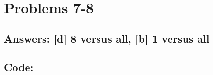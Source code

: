 \documentclass[11pt]{article}
\begin{document}
\hypertarget{problems-7-8}{%
\section{Problems 7-8}\label{problems-7-8}}

\hypertarget{answers-d-8-versus-all-b-1-versus-all}{%
\subsection{Answers: {[}d{]} 8 versus all, {[}b{]} 1 versus
all}\label{answers-d-8-versus-all-b-1-versus-all}}

\hypertarget{code}{%
\subsection{Code:}\label{code}}
\end{document}
